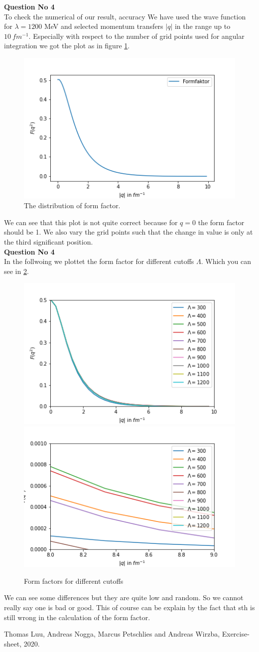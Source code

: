 \documentclass[11pt, a4paper, DIV=12]{scrartcl}
\begin{document}
\textbf{Question No 4}\\
To check the numerical of our result, accuracy We have used the wave function for $\lambda=1200 $  MeV and selected momentum transfers $ |q| $ in the range up to $ 10 ~ fm^{-1} $. Especially with
respect to the number of grid points used for angular integration we got the plot as in figure \ref{fig:1}.
\begin{figure}[H]
	\centering
	\includegraphics[width=0.6\linewidth]{problem4.png}
	\caption{ The distribution of form factor.}
	\label{fig:1}
\end{figure}
We can see that this plot is not quite correct because for $q=0$ the form factor should be 1. We also vary the grid points such that the change in value is only at the third significant position.\\
\textbf{Question No 4}\\
In the follwoing we plottet the form factor for different cutoffs $\Lambda$. Which you can see in \ref{fig:2}.
\begin{figure}[H]
	\centering
	\includegraphics[width=0.49\linewidth]{problem6.png}
	\includegraphics[width=0.49\linewidth]{problem6_2.png}
	\caption{Form factors for different cutoffs}
	\label{fig:2}
\end{figure}
We can see some differences but they are quite low and random. So we cannot really say one is bad or good. This of course can be explain by the fact that sth is still wrong in the calculation of the form factor.\\
\begin{thebibliography}{12}
Thomas Luu, Andreas Nogga, Marcus Petschlies and  Andreas Wirzba, Exercise-sheet, 2020. 
\end{thebibliography}	
\end{document}
